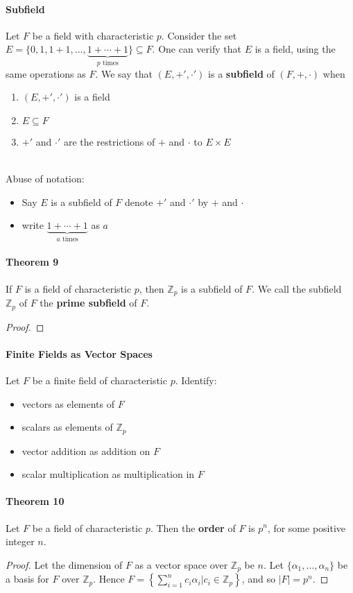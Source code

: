 \documentclass[10pt,letter]{article}
\theoremstyle{plain}
\theoremstyle{definition}
\begin{document}
\paragraph{Subfield}
Let $F$ be a field with characteristic $p$. Consider the set $E=\{0,1,1+1,\ldots,\underbrace{1+\cdots+1}_{p\text{ times}}\}\subseteq F$. One can verify that $E$ is a field, using the same operations as $F$. We say that $(E,+',\cdot')$ is a \textbf{subfield} of $(F,+,\cdot)$ when 
\begin{enumerate}
    \item $(E,+',\cdot')$ is a field 
    \item $E\subseteq F$ 
    \item $+'$ and $\cdot'$ are the restrictions of $+$ and $\cdot$ to $E\times E$
\end{enumerate}\mbox{}\\
Abuse of notation: 
\begin{itemize}
    \item Say $E$ is a subfield of $F$ denote $+'$ and $\cdot'$ by $+$ and $\cdot$
    \item write $\underbrace{1+\cdots+1}_{a\text{ times}}$ as $a$ 
\end{itemize}

\paragraph{Theorem 9}
If $F$ is a field of characteristic $p$, then $\mathbb{Z}_p$ is a subfield of $F$. We call the subfield $\mathbb{Z}_p$ of $F$ the \textbf{prime subfield} of $F$. 
\begin{proof}

\end{proof}

\paragraph{Finite Fields as Vector Spaces}
Let $F$ be a finite field of characteristic $p$. Identify: 
\begin{itemize}
    \item vectors as elements of $F$ 
    \item scalars as elements of $\mathbb{Z}_p$ 
    \item vector addition as addition on $F$ 
    \item scalar multiplication as multiplication in $F$
\end{itemize}

\paragraph{Theorem 10}
Let $F$ be a field of characteristic $p$. Then the \textbf{order} of $F$ is $p^n$, for some positive integer $n$. 
\begin{proof}
     Let the dimension of $F$ as a vector space over $\mathbb{Z}_p$ be $n$. Let $\{\alpha_1,\ldots,\alpha_n\}$ be a basis for $F$ over $\mathbb{Z}_p$. Hence $F=\left\{\sum_{i=1}^nc_i\alpha_i|c_i\in\mathbb{Z}_p\right\}$, and so $|F|=p^n$. 
\end{proof}
\end{document}
